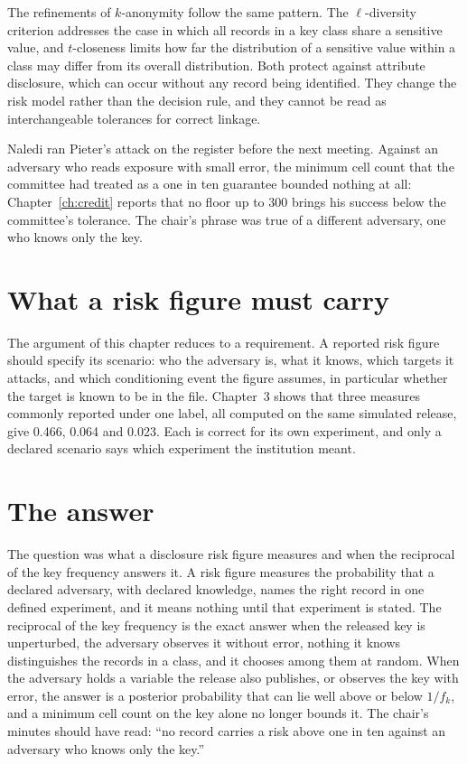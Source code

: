 The refinements of $k$-anonymity follow the same pattern. The $\ell$-diversity
criterion \citep{machanavajjhala2007} addresses the case in which all records in a
key class share a sensitive value, and $t$-closeness \citep{li2007} limits how far
the distribution of a sensitive value within a class may differ from its overall
distribution. Both protect against attribute disclosure, which can occur without
any record being identified. They change the risk model rather than the decision
rule, and they cannot be read as interchangeable tolerances for correct linkage.

Naledi ran Pieter's attack on the register before the next meeting. Against an adversary who
reads exposure with small error, the minimum cell count that the committee had treated as a
one in ten guarantee bounded nothing at all: Chapter~\ref{ch:credit} reports that no floor up
to 300 brings his success below the committee's tolerance. The chair's phrase was true of a
different adversary, one who knows only the key.

\section{What a risk figure must carry}

The argument of this chapter reduces to a requirement. A reported risk figure
should specify its scenario: who the adversary is, what it knows, which targets it
attacks, and which conditioning event the figure assumes, in particular whether the
target is known to be in the file. Chapter~3 shows that three measures commonly
reported under one label, all computed on the same simulated release, give 0.466,
0.064 and 0.023. Each is correct for its own experiment, and only a declared
scenario says which experiment the institution meant.

\section{The answer}

The question was what a disclosure risk figure measures and when the reciprocal of the key
frequency answers it. A risk figure measures the probability that a declared adversary, with
declared knowledge, names the right record in one defined experiment, and it means nothing
until that experiment is stated. The reciprocal of the key frequency is the exact answer when
the released key is unperturbed, the adversary observes it without error, nothing it knows
distinguishes the records in a class, and it chooses among them at random. When the adversary
holds a variable the release also publishes, or observes the key with error, the answer is a
posterior probability that can lie well above or below $1/f_k$, and a minimum cell count on
the key alone no longer bounds it. The chair's minutes should have read: ``no record carries a
risk above one in ten against an adversary who knows only the key.''


